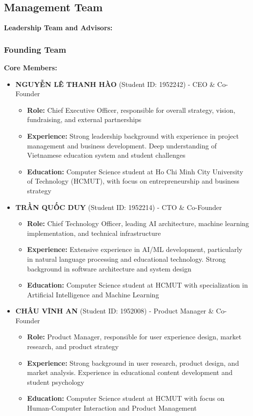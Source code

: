 \subsection{Management Team}
\textbf{Leadership Team and Advisors:}

\subsubsection{Founding Team}
\textbf{Core Members:}
\begin{itemize}
    \item \textbf{NGUYỄN LÊ THANH HÀO} (Student ID: 1952242) - CEO \& Co-Founder
    \begin{itemize}
        \item \textbf{Role:} Chief Executive Officer, responsible for overall strategy, vision, fundraising, and external partnerships
        \item \textbf{Experience:} Strong leadership background with experience in project management and business development. Deep understanding of Vietnamese education system and student challenges
        \item \textbf{Education:} Computer Science student at Ho Chi Minh City University of Technology (HCMUT), with focus on entrepreneurship and business strategy
    \end{itemize}
    
    \item \textbf{TRẦN QUỐC DUY} (Student ID: 1952214) - CTO \& Co-Founder
    \begin{itemize}
        \item \textbf{Role:} Chief Technology Officer, leading AI architecture, machine learning implementation, and technical infrastructure
        \item \textbf{Experience:} Extensive experience in AI/ML development, particularly in natural language processing and educational technology. Strong background in software architecture and system design
        \item \textbf{Education:} Computer Science student at HCMUT with specialization in Artificial Intelligence and Machine Learning
    \end{itemize}
    
    \item \textbf{CHÂU VĨNH AN} (Student ID: 1952008) - Product Manager \& Co-Founder
    \begin{itemize}
        \item \textbf{Role:} Product Manager, responsible for user experience design, market research, and product strategy
        \item \textbf{Experience:} Strong background in user research, product design, and market analysis. Experience in educational content development and student psychology
        \item \textbf{Education:} Computer Science student at HCMUT with focus on Human-Computer Interaction and Product Management
    \end{itemize}
    

\end{itemize}
